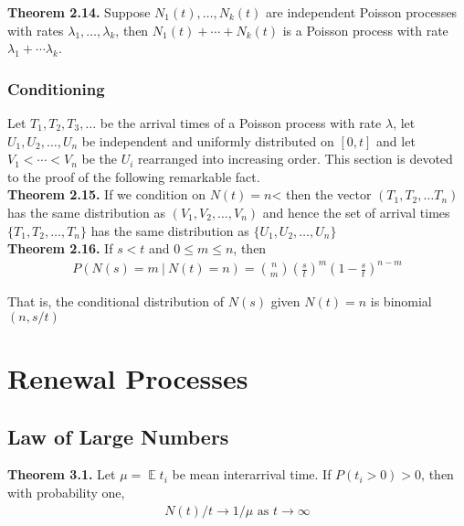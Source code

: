 \documentclass[12pt]{article}
\DeclareMathOperator*{\E}{\mathbb{E}}
\begin{document}
\textbf{Theorem 2.14.} Suppose $N_1(t), \ldots, N_k(t)$ are independent Poisson processes with rates $\lambda_1, \ldots, \lambda_k$, then $N_1(t) + \cdots + N_k(t)$ is a Poisson process with rate $\lambda_1 + \cdots \lambda_k$.


\subsubsection{Conditioning}

Let $T_1, T_2, T_3, \ldots$ be the arrival times of a Poisson process with rate $\lambda$, let $U_1, U_2, \ldots, U_n$ be independent and uniformly distributed on $[0, t]$ and let $V_1 < \cdots < V_n$ be the $U_i$ rearranged into increasing order. This section is devoted to the proof of the following remarkable fact.\\

\textbf{Theorem 2.15.} If we condition on $N(t) = n$< then the vector $(T_1, T_2, \ldots T_n)$ has the same distribution as $(V_1, V_2, \ldots, V_n)$ and hence the set of arrival times $\{T_1, T_2, \ldots, T_n\}$ has the same distribution as $\{U_1, U_2, \ldots, U_n\}$\\

\textbf{Theorem 2.16.} If $s < t$ and $0 \leq m \leq n$, then
\begin{align*}
P(N(s) = m \ | \ N(t) = n) = {n \choose m} \left( \frac{s}{t} \right)^m \left(1 - \frac{s}{t} \right)^{n-m}
\end{align*}

That is, the conditional distribution of $N(s)$ given $N(t) = n$ is binomial$(n, s/t)$

\newpage

\section{Renewal Processes}

\subsection{Law of Large Numbers}

\textbf{Theorem 3.1.} Let $\mu = \E t_i$ be mean interarrival time. If $P(t_i > 0) > 0$, then with probability one,
\begin{align*}
N(t)/t \to 1/\mu \text{  as } t \to \infty
\end{align*}
\end{document}

